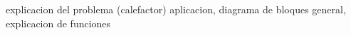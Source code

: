 explicacion del problema (calefactor) aplicacion, diagrama de bloques general, explicacion de funciones

